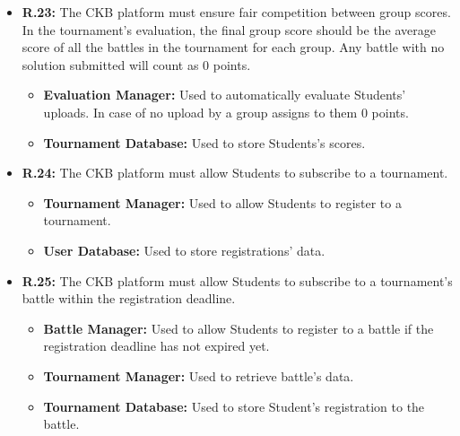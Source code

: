 \documentclass{article}
\begin{document}
{\begin{itemize}
          coherent with scores given to the same group in the battles they have partecipated in.
          \begin{itemize}
              \item \textbf{Evaluation Manager:} Used to automatically evaluate Students' uploads,
              give them a score and subsequently update Students' tournament score.
              \item \textbf{Tournament Database:} Used to store Students's scores.
          \end{itemize}
    \item \textbf{R.23:} The CKB platform must ensure fair competition between group scores. In the tournament's evaluation, the final
          group score should be the average score of all the battles in the tournament for each group. Any battle with no solution submitted will count
          as 0 points.
          \begin{itemize}
            \item \textbf{Evaluation Manager:} Used to automatically evaluate Students' uploads.
            In case of no upload by a group assigns to them 0 points.
            \item \textbf{Tournament Database:} Used to store Students's scores.
          \end{itemize}
    \item \textbf{R.24:} The CKB platform must allow Students to subscribe to a tournament.
          \begin{itemize}
              \item \textbf{Tournament Manager:} Used to allow Students to register to a tournament.
              \item \textbf{User Database:} Used to store registrations' data.
          \end{itemize}
    \item \textbf{R.25:} The CKB platform must allow Students to subscribe to a tournament's battle
          within the registration deadline.
          \begin{itemize}
              \item \textbf{Battle Manager:} Used to allow Students to register to a battle if the
              registration deadline has not expired yet.
              \item \textbf{Tournament Manager:} Used to retrieve battle's data.
              \item \textbf{Tournament Database:} Used to store Student's registration to the battle.

\end{itemize}
\end{itemize}}
\end{document}
